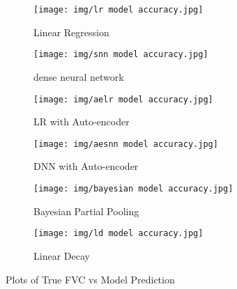 \documentclass[12pt]{article}
\begin{document}
\begin{figure}[h!]
    \centering

    \begin{subfigure}{.32\textwidth}
        \centering
        \texttt{[image: img/lr model accuracy.jpg]}
        \caption{Linear Regression}
        \label{accuracy:lr}
    \end{subfigure}
    \begin{subfigure}{.32\textwidth}
        \centering
        \texttt{[image: img/snn model accuracy.jpg]}
        \caption{dense neural network}
        \label{accuracy:dnn}
    \end{subfigure}
    \begin{subfigure}{.32\textwidth}
        \centering
        \texttt{[image: img/aelr model accuracy.jpg]}
        \caption{LR with Auto-encoder}
        \label{accuracy:aelr}
    \end{subfigure}

    \vspace{0.5em}

    \begin{subfigure}{.32\textwidth}
        \centering
        \texttt{[image: img/aesnn model accuracy.jpg]}
        \caption{DNN with Auto-encoder}
        \label{accuracy:aednn}
    \end{subfigure}
    \begin{subfigure}{.32\textwidth}
        \centering
        \texttt{[image: img/bayesian model accuracy.jpg]}
        \caption{Bayesian Partial Pooling}
        \label{accuracy:bpp}
    \end{subfigure}
    \begin{subfigure}{.32\textwidth}
        \centering
        \texttt{[image: img/ld model accuracy.jpg]}
        \caption{Linear Decay}
        \label{accuracy:ld}
    \end{subfigure}

    \caption{Plots of True FVC vs Model Prediction}
    \label{accuracy graphs}
\end{figure}
\end{document}
